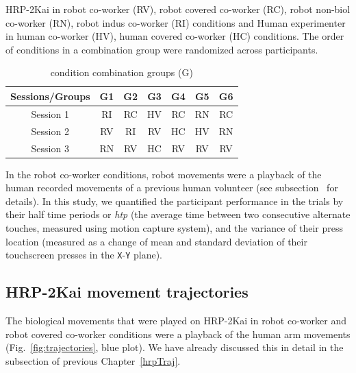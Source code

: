 \begin{table}[hpt]
	\caption{condition combination groups (G)}
	{HRP-2Kai in robot co-worker (RV), robot covered co-worker (RC), robot non-biol co-worker (RN), robot indus co-worker (RI) conditions and Human experimenter in human co-worker (HV), human covered co-worker (HC) conditions. The order of conditions in a combination group were randomized across participants.}
	\label{groupTable}
	\begin{center}
		\begin{tabular}{|c cccccc|}
			\hline  
			{\bf Sessions/Groups} &  {\bf G1} &  {\bf G2} &  {\bf G3} &  {\bf G4} &  {\bf G5} &  {\bf G6}  \\ 
			\hline
			Session 1 & RI & RC & HV & RC & RN &  RC \\ 
			
			Session 2 & RV & RI & RV & HC & HV &  RN \\ 
			
			Session 3 & RN & RV & HC & RV & RV &  RV \\ 
			\hline 			
		\end{tabular} 
	\end{center}
\end{table}


In the robot co-worker conditions, robot movements were a playback of the human recorded movements of a previous human volunteer (see subsection~ for details). In this study, we quantified the participant performance in the trials by their half time periods or {\it htp} (the average time between two consecutive alternate touches, measured using motion capture system), and the variance of their press location (measured as a change of mean and standard deviation of their touchscreen presses in the \texttt{X}-\texttt{Y} plane).

\subsection{HRP-2Kai movement trajectories} \label{HRP2_Traj}

The biological movements that were played on HRP-2Kai in robot co-worker and robot covered co-worker conditions were a playback of the human arm movements (Fig.~\ref{fig:trajectories}, blue plot). We have already discussed this in detail in the subsection of previous Chapter~\ref{hrpTraj}.

